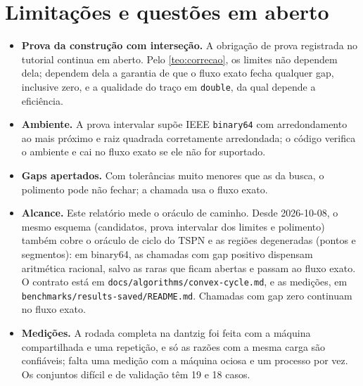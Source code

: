 \documentclass[11pt,a4paper]{article}
\theoremstyle{plain}\newtheorem{proposicao}{Proposição}
\theoremstyle{definition}\newtheorem{definicao}{Definição}
\theoremstyle{plain}\newtheorem{teorema}{Teorema}
\begin{document}
\section{Limitações e questões em aberto}
\begin{itemize}[leftmargin=*,itemsep=2pt]
\item \textbf{Prova da construção com interseção.} A obrigação de prova registrada no tutorial continua em aberto. Pelo \cref{teo:correcao}, os limites não dependem dela; dependem dela a garantia de que o fluxo exato fecha qualquer gap, inclusive zero, e a qualidade do traço em \texttt{double}, da qual depende a eficiência.
\item \textbf{Ambiente.} A prova intervalar supõe IEEE \texttt{binary64} com arredondamento ao mais próximo e raiz quadrada corretamente arredondada; o código verifica o ambiente e cai no fluxo exato se ele não for suportado.
\item \textbf{Gaps apertados.} Com tolerâncias muito menores que as da busca, o polimento pode não fechar; a chamada usa o fluxo exato.
\item \textbf{Alcance.} Este relatório mede o oráculo de caminho. Desde 2026-10-08, o mesmo esquema (candidatos, prova intervalar dos limites e polimento) também cobre o oráculo de ciclo do TSPN e as regiões degeneradas (pontos e segmentos): em binary64, as chamadas com gap positivo dispensam aritmética racional, salvo as raras que ficam abertas e passam ao fluxo exato. O contrato está em \texttt{docs/algorithms/convex-cycle.md}, e as medições, em \texttt{benchmarks/results-saved/README.md}. Chamadas com gap zero continuam no fluxo exato.
\item \textbf{Medições.} A rodada completa na dantzig foi feita com a máquina compartilhada e uma repetição, e só as razões com a mesma carga são confiáveis; falta uma medição com a máquina ociosa e um processo por vez. Os conjuntos difícil e de validação têm 19 e 18 casos.
\end{itemize}

\appendix
\end{document}
